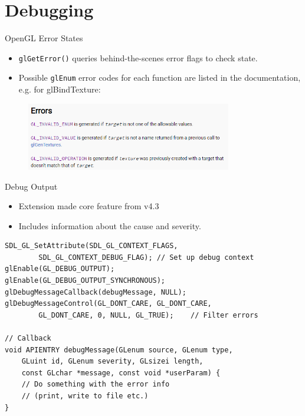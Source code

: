 \part{Debugging}
\frame{\partpage}

\begin{frame}{OpenGL Error States}
	\begin{itemize}
		\pause\item \lstinline{glGetError()} queries behind-the-scenes error flags to check state.
		\pause\item Possible \lstinline{glEnum} error codes for each function are listed in the documentation, e.g. for glBindTexture:
	\end{itemize}
	\begin{figure}[h!]
		\includegraphics[width=0.8\textwidth]{glerrors}
	\end{figure}
\end{frame}

\begin{frame}[fragile]{Debug Output}
	\begin{itemize}
		\pause\item Extension made core feature from v4.3
		\pause\item Includes information about the cause and severity.
	\end{itemize}
	\pause\begin{lstlisting}
SDL_GL_SetAttribute(SDL_GL_CONTEXT_FLAGS,
		SDL_GL_CONTEXT_DEBUG_FLAG);	// Set up debug context
glEnable(GL_DEBUG_OUTPUT);
glEnable(GL_DEBUG_OUTPUT_SYNCHRONOUS);
glDebugMessageCallback(debugMessage, NULL);
glDebugMessageControl(GL_DONT_CARE, GL_DONT_CARE,
		GL_DONT_CARE, 0, NULL, GL_TRUE);	// Filter errors

// Callback
void APIENTRY debugMessage(GLenum source, GLenum type,
	GLuint id, GLenum severity, GLsizei length,
	const GLchar *message, const void *userParam) {
	// Do something with the error info
	// (print, write to file etc.)
}
	\end{lstlisting}
\end{frame}

